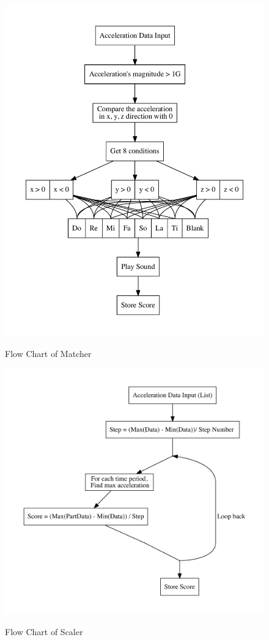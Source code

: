 \begin{figure}[H]
\begin{minipage}[b]{0.5\linewidth}
\label{indexScript}
\end{minipage}%
%
\begin{minipage}[b]{0.5\linewidth}
\centering
\includegraphics[width=1\linewidth]{figWR/ma}
\caption{Flow Chart of Matcher}
\label{FlowMatcher}
\vspace{4ex}
\centering
\includegraphics[width=1\linewidth]{figWR/sc}
\caption{Flow Chart of Scaler}
\label{FlowMatcher}
\vspace{4ex}
\end{minipage}%
\end{figure}

